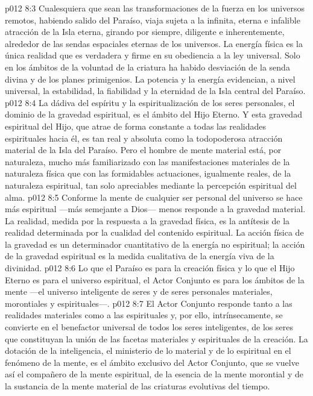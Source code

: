 \vs p012 8:3 Cualesquiera que sean las transformaciones de la fuerza en los universos remotos, habiendo salido del Paraíso, viaja sujeta a la infinita, eterna e infalible atracción de la Isla eterna, girando por siempre, diligente e inherentemente, alrededor de las sendas espaciales eternas de los universos. La energía física es la única realidad que es verdadera y firme en su obediencia a la ley universal. Solo en los ámbitos de la voluntad de la criatura ha habido desviación de la senda divina y de los planes primigenios. La potencia y la energía evidencian, a nivel universal, la estabilidad, la fiabilidad y la eternidad de la Isla central del Paraíso.
\vs p012 8:4 \pc La dádiva del espíritu y la espiritualización de los seres personales, el dominio de la gravedad espiritual, es el ámbito del Hijo Eterno. Y esta gravedad espiritual del Hijo, que atrae de forma constante a todas las realidades espirituales hacia él, es tan real y absoluta como la todopoderosa atracción material de la Isla del Paraíso. Pero el hombre de mente material está, por naturaleza, mucho más familiarizado con las manifestaciones materiales de la naturaleza física que con las formidables actuaciones, igualmente reales, de la naturaleza espiritual, tan solo apreciables mediante la percepción espiritual del alma.
\vs p012 8:5 Conforme la mente de cualquier ser personal del universo se hace más espiritual ---más semejante a Dios--- menos responde a la gravedad material. La realidad, medida por la respuesta a la gravedad física, es la antítesis de la realidad determinada por la cualidad del contenido espiritual. La acción física de la gravedad es un determinador cuantitativo de la energía no espiritual; la acción de la gravedad espiritual es la medida cualitativa de la energía viva de la divinidad.
\vs p012 8:6 \pc Lo que el Paraíso es para la creación física y lo que el Hijo Eterno es para el universo espiritual, el Actor Conjunto es para los ámbitos de la mente ---el universo inteligente de seres y de seres personales materiales, morontiales y espirituales---.
\vs p012 8:7 El Actor Conjunto responde tanto a las realidades materiales como a las espirituales y, por ello, intrínsecamente, se convierte en el benefactor universal de todos los seres inteligentes, de los seres que constituyan la unión de las facetas materiales y espirituales de la creación. La dotación de la inteligencia, el ministerio de lo material y de lo espiritual en el fenómeno de la mente, es el ámbito exclusivo del Actor Conjunto, que se vuelve así el compañero de la mente espiritual, de la esencia de la mente morontial y de la sustancia de la mente material de las criaturas evolutivas del tiempo.
